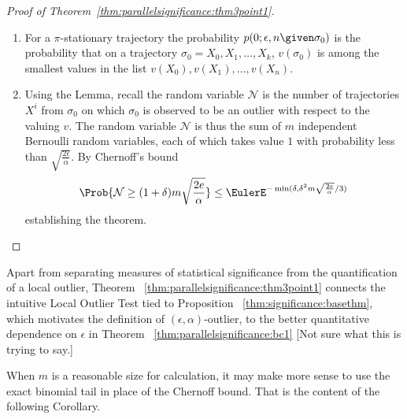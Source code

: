 \documentclass[12pt]{article}
\begin{document}
\begin{proof}[Proof of Theorem~\ref{thm:parallelsignificance:thm3point1}]
    \begin{enumerate}
        \item
            For a \( \pi \)-stationary trajectory the
            probability \( p(0; \epsilon, n \given \sigma_0) \) is the
            probability that on a trajectory \( \sigma_0 = X_0, X_1,
            \dots, X_k \), \( v(\sigma_0) \) is among the smallest
            values in the list \( v(X_0), v(X_1), \dots, v(X_n) \).
        \item
            Using the Lemma, recall the random variable \(
            \mathcal{N} \) is the number of trajectories \( X^i \) from \(
            \sigma_0 \) on which \( \sigma_0 \) is observed to be an
            outlier with respect to the valuing \( v \).  The random
            variable \( \mathcal{N} \) is thus the sum of \( m \)
            independent Bernoulli random variables, each of which takes
            value \( 1 \) with probability less than \( \sqrt{\frac{2
            \epsilon}{\alpha}} \).  By Chernoff's bound
            \[
                \Prob{\mathcal{N} \ge (1 + \delta) m \sqrt{\frac{2e}{\alpha}}
                } \le \EulerE^{ -\min (\delta, \delta^2 m \sqrt{\frac{2e}
                {\alpha}}/3)}
            \] establishing the theorem.
    \end{enumerate}
\end{proof}

  \begin{remark}
    Apart from separating measures of statistical significance from the
    quantification of a local outlier, Theorem~%
    \ref{thm:parallelsignificance:thm3point1} connects the intuitive Local
    Outlier Test tied to Proposition~%
    \ref{thm:significance:basethm}, which motivates the definition of \(
    (\epsilon, \alpha) \)-outlier, to the better quantitative dependence
    on \( \epsilon \) in Theorem~%
    \ref{thm:parallelsignificance:bc1} [Not sure what this is trying to say.]
\end{remark}

\begin{remark}
    When \( m \) is a reasonable size for calculation, it may make more
    sense to use the exact binomial tail in place of the Chernoff bound.
    That is the content of the following Corollary.
\end{remark}
\end{document}
